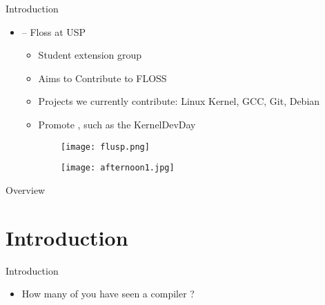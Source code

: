 \customtitlepage



\begin{frame}[fragile]{Introduction}
    \begin{itemize}
        \item {\color{blue}{FLUSP}} -- Floss at USP
            \begin{itemize}
                \item Student extension group
                \item Aims to Contribute to FLOSS
                \item Projects we currently contribute: Linux Kernel, GCC, Git, Debian
                \item Promote {\color{blue}{Contribution Events}}, such as the KernelDevDay
            \end{itemize}
    \end{itemize}


\begin{figure}[ht]
\centering
  \begin{subfigure}[b]{0.49\textwidth}
 	\texttt{[image: flusp.png]}
  \end{subfigure}
  \begin{subfigure}[b]{0.49\textwidth}
 	\texttt{[image: afternoon1.jpg]}
  \end{subfigure}
\end{figure}

\end{frame}

\begin{frame}{Overview}
  \overview
\end{frame}

\section{Introduction}


\begin{frame}{Introduction}
    \begin{itemize}
        \item How many of you have seen a compiler {\color{blue}{running in parallel}}?
    \end{itemize}
\end{frame}

